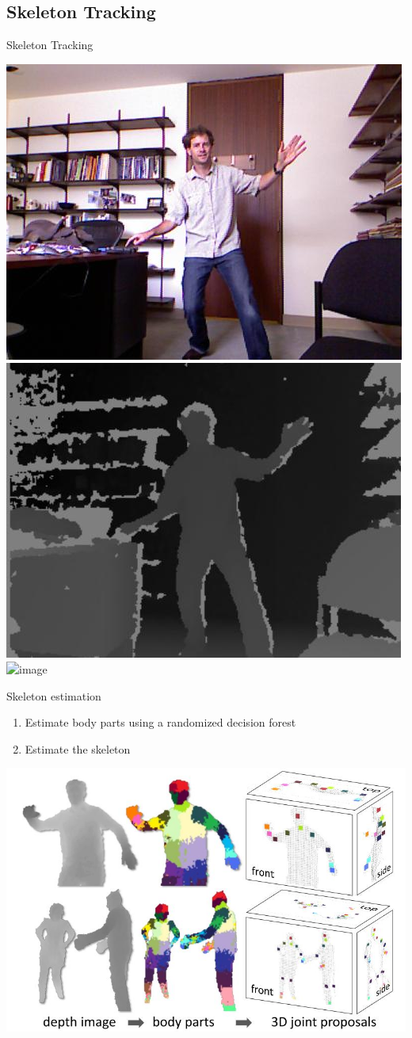 \documentclass[compress]{beamer}
\begin{document}

\subsection{Skeleton Tracking}


{
    \begin{frame}{Skeleton Tracking}

        \begin{center}
            \includegraphics[width=0.3\linewidth]{skeleton/skel3}
            \includegraphics[width=0.3\linewidth]{skeleton/skel2}
            \includegraphics<2>[width=0.3\linewidth]{skeleton/skel1}
        \end{center}
\end{frame}
}

{

\begin{frame}{Skeleton estimation}
    \begin{enumerate}
        \item Estimate body parts using a randomized decision forest
        \item Estimate the skeleton
    \end{enumerate}
    \begin{center}
        \includegraphics[width=0.8\linewidth]{skeleton/skeleton_estimation}
    \end{center}
\end{frame}
}
\end{document}
